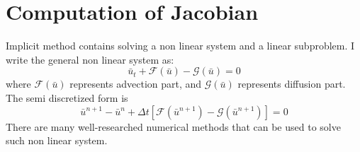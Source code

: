 \documentclass[smallextended]{svjour3}       %
\begin{document}
\section{Computation of Jacobian}
Implicit method contains solving a non linear system and a linear subproblem.
I write the general non linear system as:
\begin{equation} \label{eq:nonlinear}
		  \bar u_t + \mathscr{F}(\bar u) - \mathscr{G}(\bar u) = 0
\end{equation}
where $\mathscr{F}(\bar u)$ represents advection part, and $\mathscr{G} (\bar u)$ represents diffusion part.
The semi discretized form is 
\begin{equation}
		  \bar u^{n+1} - \bar u^{n} + \Delta t [\mathscr{F} (\bar u^{n+1}) - \mathscr{G}(\bar u^{n+1})] = 0
\end{equation}
There are many well-researched numerical methods that can be used to solve such non linear system.
\end{document}
